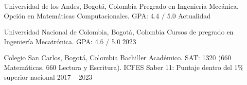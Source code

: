 \cvsection{\EducationLabel}

\cvedu
{Universidad de los Andes, Bogotá, Colombia}
{Pregrado en Ingeniería Mecánica, Opción en Matemáticas Computacionales. GPA: 4.4 / 5.0}
{Actualidad}

\entryspace

\cvedu
{Universidad Nacional de Colombia, Bogotá, Colombia}
{Cursos de pregrado en Ingeniería Mecatrónica. GPA: 4.6 / 5.0}
{2023}

\entryspace

\cvedu
{Colegio San Carlos, Bogotá, Colombia}
{Bachiller Académico. SAT: 1320 (660 Matemáticas, 660 Lectura y Escritura). ICFES Saber 11: Puntaje dentro del 1\% superior nacional}
{2017 -- 2023}